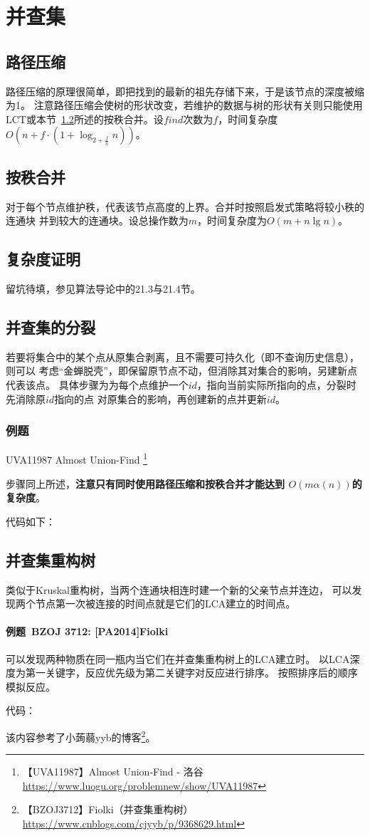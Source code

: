 \section{并查集}\label{DSU}
\subsection{路径压缩}
路径压缩的原理很简单，即把找到的最新的祖先存储下来，于是该节点的深度被缩为1。
注意路径压缩会使树的形状改变，若维护的数据与树的形状有关则只能使用
LCT或本节~\ref{RankMerge}所述的按秩合并。设$find$次数为$f$，时间复杂度
$O(n+f\cdot (1+\log_{2+\frac{f}{n}}n))$。
\subsection{按秩合并}\label{RankMerge}
对于每个节点维护秩，代表该节点高度的上界。合并时按照启发式策略将较小秩的连通块
并到较大的连通块。设总操作数为$m$，时间复杂度为$O(m+n\lg n)$。
\subsection{复杂度证明}
留坑待填，参见算法导论\cite{ITA3}中的21.3与21.4节。
\subsection{并查集的分裂}
若要将集合中的某个点从原集合剥离，且不需要可持久化（即不查询历史信息），则可以
考虑``金蝉脱壳''，即保留原节点不动，但消除其对集合的影响，另建新点代表该点。
具体步骤为为每个点维护一个$id$，指向当前实际所指向的点，分裂时先消除原$id$指向的点
对原集合的影响，再创建新的点并更新$id$。

\subsubsection{例题}

UVA11987 Almost Union-Find \footnote{
    【UVA11987】Almost Union-Find - 洛谷
    \url{https://www.luogu.org/problemnew/show/UVA11987}}

步骤同上所述，{\bfseries 注意只有同时使用路径压缩和按秩合并才能达到
$O(m\alpha(n))$的复杂度}。

代码如下：


\subsection{并查集重构树}
类似于Kruskal重构树，当两个连通块相连时建一个新的父亲节点并连边，
可以发现两个节点第一次被连接的时间点就是它们的LCA建立的时间点。

\paragraph{例题~BZOJ 3712: [PA2014]Fiolki}

可以发现两种物质在同一瓶内当它们在并查集重构树上的LCA建立时。
以LCA深度为第一关键字，反应优先级为第二关键字对反应进行排序。
按照排序后的顺序模拟反应。

代码：


该内容参考了小蒟蒻yyb的博客\footnote{
    【BZOJ3712】Fiolki（并查集重构树）
    \url{https://www.cnblogs.com/cjyyb/p/9368629.html}
}。
